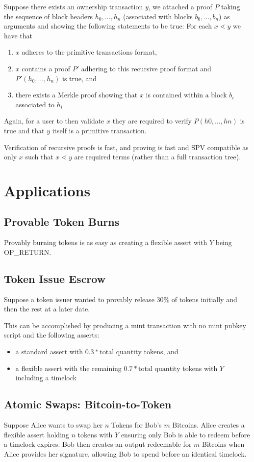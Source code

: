 \documentclass[9pt,oneside]{amsart}
\begin{document}
\begin{multicols}{2}
Suppose there exists an ownership transaction $y$, we attached a proof $P$ taking the sequence of block headers $h_{0}, \dots, h_{n}$ (associated with blocks $b_{0}, \dots, b_{n}$) as arguments and showing the following statements to be true:
For each $x \lessdot y$ we have that
\begin{enumerate}
    \item $x$ adheres to the primitive transactions format,
    \item $x$ contains a proof $P'$ adhering to this recursive proof format and $P'(h_{0}, \dots, h_{n})$ is true, and
    \item there exists a Merkle proof showing that $x$ is contained within a block $b_{i}$ associated to $h_{i}$
\end{enumerate}

Again, for a user to then validate $x$ they are required to verify $P(h{0}, \dots, h{n})$ is true and that $y$ itself is a primitive transaction.

Verification of recursive proofs is fast, and proving is fast and SPV compatible as only $x$ such that $x \lessdot y$ are required terms (rather than a full transaction tree).

\section{Applications}
\subsection{Provable Token Burns}
Provably burning tokens is as easy as creating a flexible assert with $Y$ being OP\_RETURN.
\subsection{Token Issue Escrow}
Suppose a token issuer wanted to provably release 30\% of tokens initially and then the rest at a later date.

This can be accomplished by producing a mint transaction with no mint pubkey script and the following asserts:
\begin{itemize}
    \item a standard assert with $0.3*\text{total quantity}$ tokens, and
    \item a flexible assert with the remaining $0.7*\text{total quantity}$ tokens with $Y$ including a timelock
\end{itemize}

\subsection{Atomic Swaps: Bitcoin-to-Token}
Suppose Alice wants to swap her $n$ Tokens for Bob's $m$ Bitcoins. Alice creates a flexible assert holding $n$ tokens with $Y$ ensuring only Bob is able to redeem before a timelock expires. Bob then creates an output redeemable for $m$ Bitcoins when Alice provides her signature, allowing Bob to spend before an identical timelock.


\end{multicols}
\end{document}

